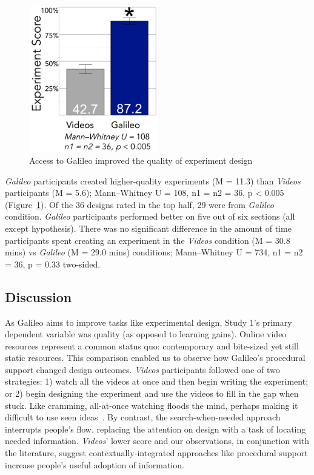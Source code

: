 \begin{figure}[h]
  \includegraphics[width=0.5\textwidth]{figures/galileo/galileo-study1-7}
  \caption[Access to Galileo improved the quality of experiment design]
{Access to Galileo improved the quality of experiment design}
  \label{fig:galileo-result}
\end{figure}

\textit{Galileo} participants created higher-quality experiments (M = 11.3) than \textit{Videos} participants (M = 5.6); Mann–Whitney U = 108, n1 = n2 = 36, p < 0.005 (Figure~\ref{fig:galileo-result}). Of the 36 designs rated in the top half, 29 were from \textit{Galileo} condition. \textit{Galileo} participants performed better on five out of six sections (all except hypothesis). There was no significant difference in the amount of time participants spent creating an experiment in the \textit{Videos} condition (M = 30.8 mins) vs \textit{Galileo} (M = 29.0 mins) conditions; Mann–Whitney U = 734, n1 = n2 = 36, p = 0.33 two-sided. 

\subsection*{Discussion}
As Galileo aims to improve tasks like experimental design, Study 1's primary dependent variable was quality (as opposed to learning gains). Online video resources represent a common status quo: contemporary and bite-sized yet still static resources. This comparison enabled us to observe how Galileo's procedural support changed design outcomes. \textit{Videos} participants followed one of two strategies: 1) watch all the videos at once and then begin writing the experiment; or 2) begin designing the experiment and use the videos to fill in the gap when stuck. Like cramming, all-at-once watching floods the mind, perhaps making it difficult to use seen ideas~\cite{kornell2009optimising}. By contrast, the search-when-needed approach interrupts people's flow, replacing the attention on design with a task of locating needed information. \textit{Videos}' lower score and our observations, in conjunction with the literature, suggest contextually-integrated approaches like procedural support increase people's useful adoption of information.
   
